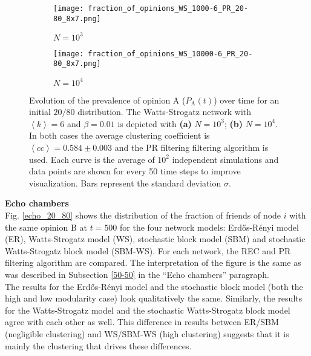 \documentclass[11 pt , letterpaper , twoside , openright]{book}
\begin{document}
\begin{figure}[H]
  \begin{subfigure}[b]{0.49\textwidth}
    \caption{$N = 10^3$}
  	\texttt{[image: fraction\_of\_opinions\_WS\_1000-6\_PR\_20-80\_8x7.png]}
    \label{ws1000}
  \end{subfigure}
  \begin{subfigure}[b]{0.49\textwidth}
    \caption{$N = 10^4$}
  	\texttt{[image: fraction\_of\_opinions\_WS\_10000-6\_PR\_20-80\_8x7.png]}
    \label{ws10000}
  \end{subfigure}
  \captionsetup{format=plain}
  \caption[Evolution of the prevalence of opinion A ($P_\text{A}(t)$) over time for an initial $20/80$ opinion distribution for a WS model with $N=10^3$ or $N=10^4$, $\left<k\right>=6$ and $\beta = 0.01$. The PR filtering algorithm is used.]{Evolution of the prevalence of opinion A ($P_\text{A}(t)$) over time for an initial $20/80$ distribution. The Watts-Strogatz network with $\left<k\right> = 6$ and $\beta = 0.01$ is depicted with \textbf{(a)} $N=10^3$; \textbf{(b)} $N=10^4$. In both cases the average clustering coefficient is $\left<cc\right> = 0.584 \pm 0.003$ and the PR filtering filtering algorithm is used. Each curve is the average of $10^2$ independent simulations and data points are shown for every 50 time steps to improve visualization. Bars represent the standard deviation $\sigma$.}
\label{ev_op_WS_k=6}
\end{figure}
\noindent
\textbf{Echo chambers}\\
\newline
Fig. \ref{echo_20_80} shows the distribution of the fraction of friends of node $i$ with the same opinion B at $t=500$ for the four network models: Erd\H{o}s-R\'{e}nyi model (ER), Watts-Strogatz model (WS), stochastic block model (SBM) and stochastic Watts-Strogatz block model (SBM-WS). For each network, the REC and PR filtering algorithm are compared. The interpretation of the figure is the same as was described in Subsection \ref{50-50} in the ``Echo chambers'' paragraph.\\
\newline
The results for the Erd\H{o}s-R\'{e}nyi model and the stochastic block model (both the high and low modularity case) look qualitatively the same. Similarly, the results for the Watts-Strogatz model and the stochastic Watts-Strogatz block model agree with each other as well. This difference in results between ER/SBM (negligible clustering) and WS/SBM-WS (high clustering) suggests that it is mainly the clustering that drives these differences.\\
\end{document}
